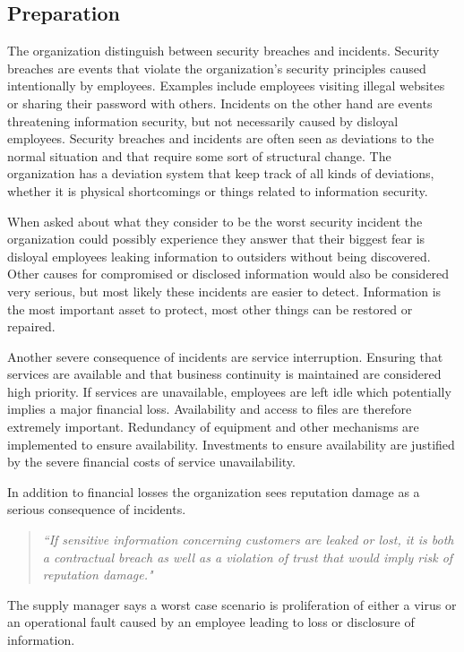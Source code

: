 \subsection{Preparation}
The organization distinguish between security breaches and incidents. Security breaches are events that violate the organization's security principles caused intentionally by employees. Examples include employees visiting illegal websites or sharing their password with others. Incidents on the other hand are events threatening information security, but not necessarily caused by disloyal employees. Security breaches and incidents are often seen as deviations to the normal situation and that require some sort of structural change. The organization has a deviation system that keep track of all kinds of deviations, whether it is physical shortcomings or things related to information security.

When asked about what they consider to be the worst security incident the organization could possibly experience they answer that their biggest fear is disloyal employees leaking information to outsiders without being discovered. Other causes for compromised or disclosed information would also be considered very serious, but most likely these incidents are easier to detect. Information is the most important asset to protect, most other things can be restored or repaired.

Another severe consequence of incidents are service interruption. Ensuring that services are available and that business continuity is maintained are considered high priority. If services are unavailable, employees are left idle which potentially implies a major financial loss. Availability and access to files are therefore extremely important. Redundancy of equipment and other mechanisms are implemented to ensure availability. Investments to ensure availability are justified by the severe financial costs of service unavailability.

In addition to financial losses the organization sees reputation damage as a serious consequence of incidents. 
\begin{quote}
\textit{``If sensitive information concerning customers are leaked or lost, it is both a contractual breach as well as a violation of trust that would imply risk of reputation damage."}
\end{quote}

The supply manager says a worst case scenario is proliferation of either a virus or an operational fault caused by an employee leading to loss or disclosure of information.

